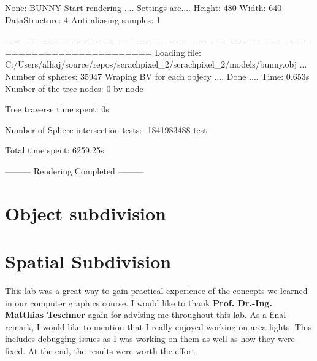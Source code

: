 \documentclass[11pt,a4paper]{article}
\begin{document}
None: BUNNY
Start rendering ....
Settings are....
Height: 480
Width: 640
DataStructure: 4
Anti-aliasing samples: 1

====================================================================
Loading file:  C:/Users/alhaj/source/repos/scrachpixel_2/scrachpixel_2/models/bunny.obj ...
Number of spheres: 35947
Wraping BV for each objecy ....
Done ....
Time: 0.653s
 Number of the tree nodes: 0 bv node

Tree traverse time spent: 0s

Number of Sphere intersection tests: -1841983488 test

Total time spent: 6259.25s

--------- Rendering Completed ---------
	\section{Object subdivision}
	\section{Spatial Subdivision}
	
	This lab was a great way to gain practical experience of the concepts we learned in our computer graphics course. I would like to thank \textbf{Prof. Dr.-Ing. Matthias Teschner} again for advising me throughout this lab. As a final remark, I would like to mention that I really enjoyed working on area lights. This includes debugging issues as I was working on them as well as how they were fixed. At the end, the results were worth the effort.
	
	
	
	
\end{document}
